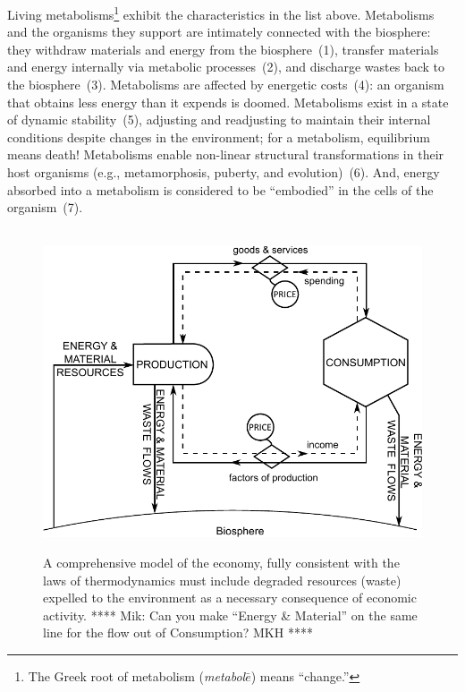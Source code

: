 Living metabolisms\footnote{The 
	Greek root of metabolism 
	(\emph{metabol$\bar{e}$}) means ``change.''}
exhibit the characteristics in the list above.
Metabolisms and the organisms they support
are intimately connected with the biosphere:
they withdraw materials and energy from the biosphere~(1), 
transfer materials and energy internally via metabolic processes~(2), 
and discharge wastes back to the biosphere~(3).
Metabolisms are affected by energetic costs~(4): 
an organism that obtains less energy than it expends is doomed.
Metabolisms exist in a state of dynamic stability~(5),
adjusting and readjusting to maintain their internal conditions
despite changes in the environment; 
for a metabolism, equilibrium means death!
Metabolisms enable non-linear structural transformations
in their host organisms (e.g., metamorphosis, puberty, and evolution)~(6).
And, energy absorbed into a metabolism is considered to be ``embodied''
in the cells of the organism~(7).

\begin{figure}[!ht]
\centering\
\includegraphics[width=\linewidth]{Part_0/Chapter_Introduction/images/PERKS.pdf}
\caption[A comprehensive biophysical model of the economy]{A comprehensive model 
of the economy, fully consistent with the laws of thermodynamics 
must include degraded resources (waste) expelled 
to the environment as a necessary consequence of economic activity.
**** Mik: Can you make ``Energy \& Material'' on the same line 
for the flow out of Consumption? MKH ****}
\label{fig:metabolic_economy}
\end{figure}

